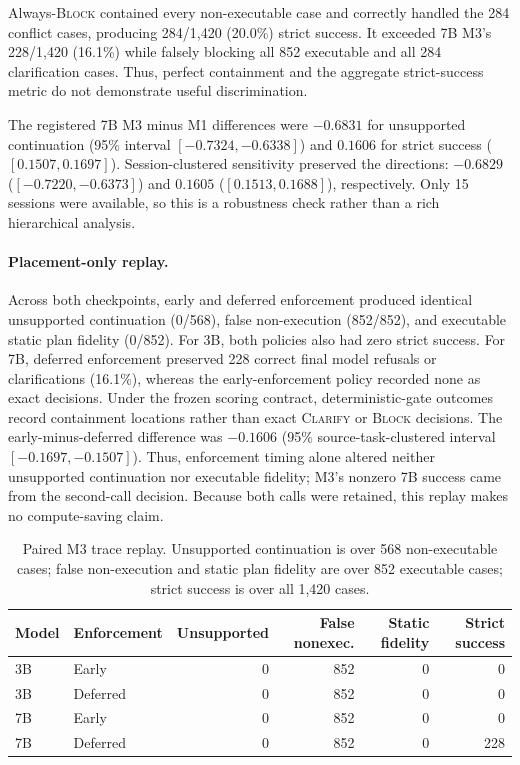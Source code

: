\documentclass{article}
\newcommand{\Mone}{\textsc{M1}\xspace}
\newcommand{\Mthree}{\textsc{M3}\xspace}
\begin{document}
Always-\textsc{Block} contained every non-executable case and correctly handled
the 284 conflict cases, producing 284/1,420 (20.0\%) strict success. It exceeded
7B \Mthree's 228/1,420 (16.1\%) while falsely blocking all 852 executable and
all 284 clarification cases. Thus, perfect containment and the aggregate
strict-success metric do not demonstrate useful discrimination.

The registered 7B \Mthree{} minus \Mone differences were $-0.6831$ for
unsupported continuation (95\% interval $[-0.7324,-0.6338]$) and $0.1606$ for
strict success ($[0.1507,0.1697]$). Session-clustered sensitivity preserved the
directions: $-0.6829$ ($[-0.7220,-0.6373]$) and $0.1605$
($[0.1513,0.1688]$), respectively. Only 15 sessions were available, so this is
a robustness check rather than a rich hierarchical analysis.

\paragraph{Placement-only replay.}
Across both checkpoints, early and deferred enforcement produced identical
unsupported continuation (0/568), false non-execution (852/852), and executable
static plan fidelity (0/852). For 3B, both policies also had zero strict success.
For 7B, deferred enforcement preserved 228 correct final model refusals or
clarifications (16.1\%), whereas the early-enforcement policy recorded none as
exact decisions. Under the frozen scoring contract, deterministic-gate outcomes
record containment locations rather than exact \textsc{Clarify} or
\textsc{Block} decisions. The early-minus-deferred difference was $-0.1606$ (95\%
source-task-clustered interval $[-0.1697,-0.1507]$). Thus, enforcement timing
alone altered neither unsupported continuation nor executable fidelity;
\Mthree's nonzero 7B success came from the second-call decision. Because both
calls were retained, this replay makes no compute-saving claim.

\begin{table}[t]
  \centering
  \caption{Paired \Mthree trace replay. Unsupported continuation is over 568
  non-executable cases; false non-execution and static plan fidelity are over
  852 executable cases; strict success is over all 1,420 cases.}
  \label{tab:placement-replay}
  \small
  \setlength{\tabcolsep}{5pt}
  \begin{tabular}{@{}llrrrr@{}}
    \toprule
    Model & Enforcement & Unsupported & False nonexec. & Static fidelity & Strict success \\
    \midrule
    3B & Early    & 0 & 852 & 0 & 0 \\
    3B & Deferred & 0 & 852 & 0 & 0 \\
    7B & Early    & 0 & 852 & 0 & 0 \\
    7B & Deferred & 0 & 852 & 0 & 228 \\
    \bottomrule
  \end{tabular}
\end{table}
\end{document}
